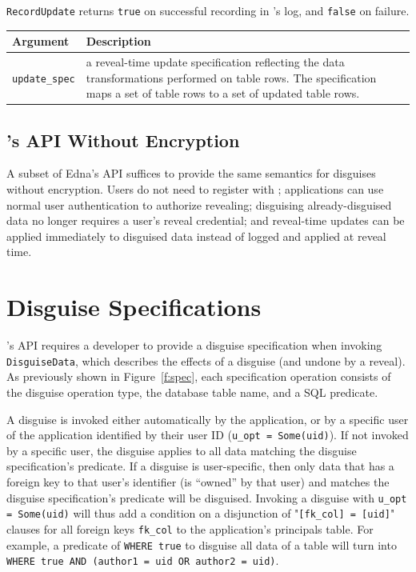 \texttt{RecordUpdate} returns \texttt{true} on successful recording in \sys's
    log, and \texttt{false} on failure.

\begin{center}
    \begin{longtable}{|m{}|m{}|}
        \hline
        \textbf{Argument} & \textbf{Description} \\
        \hline
             \texttt{update\_spec}& a reveal-time update specification reflecting
    the data transformations performed on table rows. The specification maps a
    set of table rows to a set of updated table rows.\\
        \hline
    \end{longtable}
    \end{center}

    
\subsection{\sys's API Without Encryption}
\label{s:noencrypt-api}
A subset of Edna's API suffices to provide the same semantics for disguises
without encryption. Users do not need to register with \sys; applications can
use normal user authentication to authorize revealing; disguising
already-disguised data no longer requires a user's reveal credential; and
reveal-time updates can be applied immediately to disguised data instead of
logged and applied at reveal time.

\section{Disguise Specifications}
\label{s:semantics:spec}

\sys's API requires a developer to provide a disguise specification when
invoking \texttt{DisguiseData}, which describes the effects of a disguise (and
undone by a reveal).  As previously shown in Figure~\ref{f:spec}, each
specification operation consists of the disguise operation type, the database
table name, and a SQL  predicate.
%

%
A disguise is invoked either automatically by the application, or by a specific
user of the application identified by their user ID (\texttt{u\_opt =
Some(uid)}).
% 
If not invoked by a specific user, the disguise applies to all data matching the
disguise specification's predicate.
%
If a disguise is user-specific, then only data that has a foreign key to that
user's identifier (is ``owned'' by that user) and matches the disguise
specification's predicate will be disguised. Invoking a disguise with
\texttt{u\_opt = Some(uid)} will thus add a condition on a disjunction of
"\texttt{[fk\_col] = [uid]}" clauses for all foreign keys \texttt{fk\_col} to
the application's principals table. For example, a predicate of \texttt{WHERE
true} to disguise all data of a table will turn into \texttt{WHERE true AND
(author1 = uid OR author2 = uid)}.

